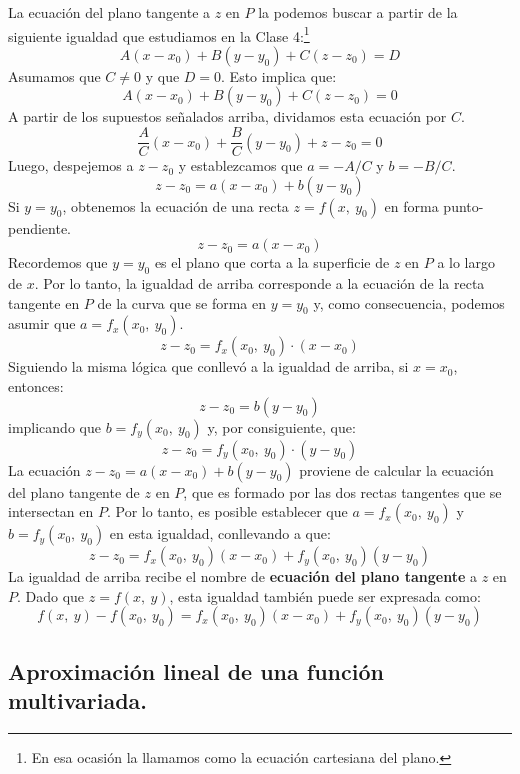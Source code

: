 \documentclass[12pt]{article}
\begin{document}
La ecuación del plano tangente a $z$ en $P$ la podemos buscar a partir de la siguiente igualdad que estudiamos en la Clase 4:\footnote{En esa ocasión la llamamos como la ecuación cartesiana del plano.}
\[
  A(x - x_{0}) + B(y - y_{0}) + C(z - z_{0}) = D
\]
Asumamos que $C \neq 0$ y que $D = 0$. Esto implica que:
\[
  A(x - x_{0}) + B(y - y_{0}) + C(z - z_{0}) = 0
\]
A partir de los supuestos señalados arriba, dividamos esta ecuación por $C$.
\[
  \frac{A}{C}(x - x_{0}) + \frac{B}{C}(y - y_{0}) + z - z_{0} = 0
\]
Luego, despejemos a $z - z_{0}$ y establezcamos que $a = -A/C$ y $b = -B/C$.
\[
  z - z_{0} = a(x - x_{0}) + b(y - y_{0})
\]
Si $y = y_{0}$, obtenemos la ecuación de una recta $z = f(x, \ y_{0})$ en forma punto-pendiente.
\[
  z - z_{0} = a(x - x_{0})
\]
Recordemos que $y = y_{0}$ es el plano que corta a la superficie de $z$ en $P$ a lo largo de $x$. Por lo tanto, la igualdad de arriba corresponde a la ecuación de la recta tangente en $P$ de la curva que se forma en $y = y_{0}$ y, como consecuencia, podemos asumir que $a = f_{x}(x_{0}, \ y_{0})$.
\[
  z - z_{0} = f_{x}(x_{0}, \ y_{0}) \cdot (x - x_{0})
\]
Siguiendo la misma lógica que conllevó a la igualdad de arriba, si $x = x_{0}$, entonces:
\[
  z - z_{0} = b(y - y_{0})
\]
implicando que $b = f_{y}(x_{0}, \ y_{0})$ y, por consiguiente, que:
\[
  z - z_{0} = f_{y}(x_{0}, \ y_{0}) \cdot (y - y_{0})
\]
La ecuación $z - z_{0} = a(x - x_{0}) + b(y - y_{0})$ proviene de calcular la ecuación del plano tangente de $z$ en $P$, que es formado por las dos rectas tangentes que se intersectan en $P$. Por lo tanto, es posible establecer que $a = f_{x}(x_{0}, \ y_{0})$ y $b = f_{y}(x_{0}, \ y_{0})$ en esta igualdad, conllevando a que:
\[
  z - z_{0} = f_{x}(x_{0}, \ y_{0}) (x - x_{0}) + f_{y}(x_{0}, \ y_{0}) (y - y_{0})
\]
La igualdad de arriba recibe el nombre de \textbf{ecuación del plano tangente} a $z$ en $P$. Dado que $z = f(x, \ y)$, esta igualdad también puede ser expresada como:
\[
  f(x, \ y) - f(x_{0}, \ y_{0}) = f_{x}(x_{0}, \ y_{0}) (x - x_{0}) + f_{y}(x_{0}, \ y_{0}) (y - y_{0})
\]

\subsection{Aproximación lineal de una función multivariada.}
\end{document}
